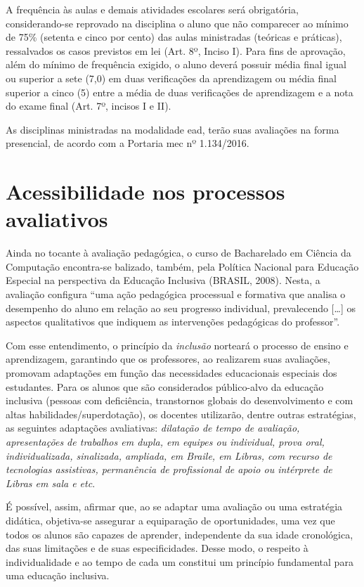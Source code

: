 \documentclass[
	12pt,				%
	openright,			%
  oneside,     %
	a4paper,			%
 hyphens,
	chapter=TITLE,		%
	english,			%
	french,				%
	spanish,			%
	brazil				%
	]{abntex2}
\begin{document}
A frequência às aulas e demais atividades escolares será obrigatória, conside\-ran\-do-se reprovado na disciplina o aluno que não comparecer ao mínimo de 75\% (setenta e cinco por cento) das aulas ministradas (teóricas e práticas), ressalvados os casos previstos em lei (Art. 8º, Inciso I). Para fins de aprovação, além do mínimo de frequência exigido, o aluno deverá possuir média final igual ou superior a sete (7,0) em duas verificações da aprendizagem ou média final superior a cinco (5) entre a média de duas verificações de aprendizagem e a nota do exame final (Art. 7º, incisos I e II).

As disciplinas ministradas na modalidade \acrshort{ead}, terão suas avaliações na forma presencial, de acordo com a Portaria \acrshort{mec} nº 1.134/2016.

\section{Acessibilidade nos processos avaliativos}

Ainda no tocante à avaliação pedagógica, o curso de Bacharelado em Ciência da Computação encontra-se balizado, também, pela Política Nacional para Educação Especial na perspectiva da Educação Inclusiva (BRASIL, 2008). Nesta, a avaliação configura “uma ação pedagógica processual e formativa que analisa o desempenho do aluno em relação ao seu progresso individual, prevalecendo [\ldots] os aspectos qualitativos que indiquem as intervenções pedagógicas do professor”.

Com esse entendimento, o princípio da \textit{inclusão} norteará o processo de ensino e aprendizagem, garantindo que os professores, ao realizarem suas avaliações, promovam adaptações em função das necessidades educacionais especiais dos estudantes. Para os alunos que são considerados público-alvo da educação inclusiva (pessoas com deficiência, transtornos globais do desenvolvimento e com altas habilidades/superdotação), os docentes utilizarão, dentre outras estratégias, as seguintes adaptações avaliativas: \textit{dilatação de tempo de avaliação, apresentações de trabalhos em dupla, em equipes ou individual, prova oral, individualizada, sinalizada, ampliada, em Braile, em Libras, com recurso de tecnologias assistivas, permanência de profissional de apoio ou intérprete de Libras em sala e etc}.

É possível, assim, afirmar que, ao se adaptar uma avaliação ou uma estratégia didática, objetiva-se assegurar a equiparação de oportunidades, uma vez que todos os alunos são capazes de aprender, independente da sua idade cronológica, das suas limitações e de suas especificidades. Desse modo, o respeito à individualidade e ao tempo de cada um constitui um princípio fundamental para uma educação inclusiva.
\end{document}
